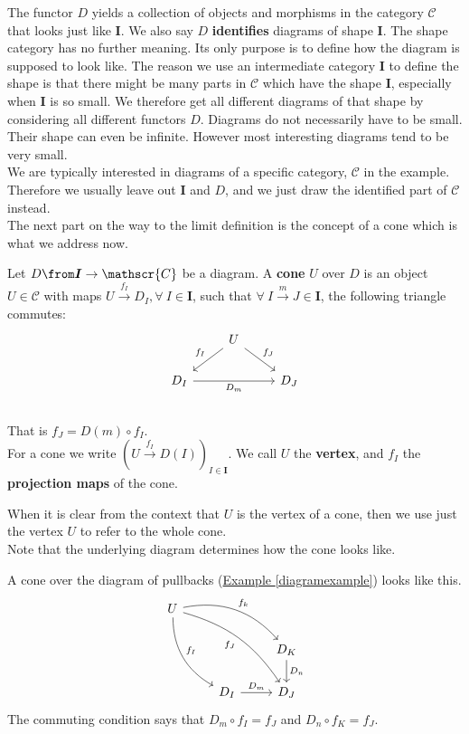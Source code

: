 The functor $D$ yields
a collection of objects and morphisms in the category $\mathscr C$
that looks just like $\bm I$.
We also say $D$ \textbf{identifies} diagrams of shape $\bm I$.
The shape category has no further meaning. Its only purpose
is to define how the diagram is supposed to look like.
The reason we use an intermediate
category $\bm I$ to define the shape is that
there might be many parts in $\mathscr C$ which have the shape $\bm I$,
especially when $\bm I$ is so small.
We therefore get all different diagrams of that shape by considering
all different functors $D$.
Diagrams do not necessarily have to be small. Their shape can even be infinite.
However most interesting diagrams tend to be very small.\\
We are typically interested in diagrams of a specific category,
$\mathscr C$ in the example. Therefore we usually leave out $\bm I$ and $D$,
and we just draw the identified part of $\mathscr C$ instead.\\
The next part on the way to the limit definition is the concept of a cone which
is what we address now.
\begin{definition}
  Let $D \from \bm{I} \to \mathscr{C}$ be a diagram.
  A \textbf{cone} $U$ over $D$ is an object $U \in \mathscr{C}$
  with maps $U \overset{f_I}{\rightarrow} D_I, \forall\ I \in \bm{I}$, such that
  $\forall\ I \overset{m}{\to} J \in \bm{I}$, the following triangle commutes:
  \[
    \begin{tikzcd}
      & U \arrow[dl, swap, "f_I"] \arrow{dr}{f_J}&\\
      D_I \arrow[rr, swap, "D_m"] & & D_J\\
    \end{tikzcd}
  \]
  That is $f_J = D(m) \circ f_I$.\\
  For a cone we write $(U \overset{f_I}{\to} D(I))_{I\in \bm{I}}$.
  We call $U$ the \textbf{vertex}, and $f_I$ the \textbf{projection maps} of the cone.
\end{definition}
\begin{remark}
  When it is clear from the context that $U$ is the vertex of a cone, then we use just
  the vertex $U$
  to refer to the whole cone.\\
  Note that the underlying diagram determines how the cone looks like.
\end{remark}
\begin{example}
  A cone over the diagram of pullbacks
  (\hyperref[diagramexample]{Example \ref*{diagramexample}}) looks like this.
  \[
    \begin{tikzcd}
      U \arrow[bend right=30]{ddr}{f_I} \arrow[bend left=30]{drr}{f_k} \arrow[bend left=20, swap]{ddrr}{f_J}&   &\\
      & & D_K \arrow{d}{D_n} \\
      & D_I \arrow{r}{D_m} & D_J
    \end{tikzcd}
  \]
  The commuting condition says that $D_m \circ f_I = f_J$ and $D_n \circ f_K = f_J$.
\end{example}

